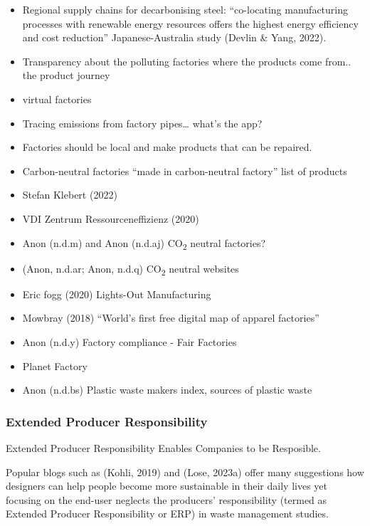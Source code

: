 \documentclass[
  letterpaper,
  DIV=11,
  numbers=noendperiod]{scrartcl}
\begin{document}
\begin{itemize}
\item
  Regional supply chains for decarbonising steel: ``co-locating
  manufacturing processes with renewable energy resources offers the
  highest energy efficiency and cost reduction'' Japanese-Australia
  study (Devlin \& Yang, 2022).
\item
  Transparency about the polluting factories where the products come
  from.. the product journey
\item
  virtual factories
\item
  Tracing emissions from factory pipes\ldots{} what's the app?
\item
  Factories should be local and make products that can be repaired.
\item
  Carbon-neutral factories ``made in carbon-neutral factory'' list of
  products
\item
  Stefan Klebert (2022)
\item
  VDI Zentrum Ressourceneffizienz (2020)
\item
  Anon (n.d.m) and Anon (n.d.aj) CO\textsubscript{2} neutral factories?
\item
  (Anon, n.d.ar; Anon, n.d.q) CO\textsubscript{2} neutral websites
\item
  Eric fogg (2020) Lights-Out Manufacturing
\item
  Mowbray (2018) ``World's first free digital map of apparel factories''
\item
  Anon (n.d.y) Factory compliance - Fair Factories
\item
  Planet Factory
\item
  Anon (n.d.bs) Plastic waste makers index, sources of plastic waste
\end{itemize}

\subsubsection{Extended Producer
Responsibility}\label{extended-producer-responsibility}

Extended Producer Responsibility Enables Companies to be Resposible.

Popular blogs such as (Kohli, 2019) and (Lose, 2023a) offer many
suggestions how designers can help people become more sustainable in
their daily lives yet focusing on the end-user neglects the producers'
responsibility (termed as Extended Producer Responsibility or ERP) in
waste management studies.
\end{document}
